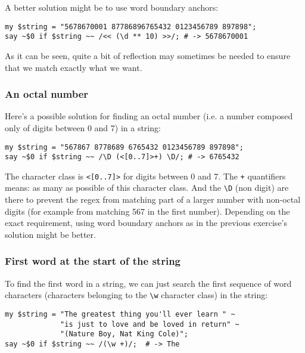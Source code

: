 A better solution might be to use word boundary anchors:

\begin{verbatim}
my $string = "5678670001 87786896765432 0123456789 897898";
say ~$0 if $string ~~ /<< (\d ** 10) >>/; # -> 5678670001
\end{verbatim}

As it can be seen, quite a bit of reflection may 
sometimes be needed to ensure that we match exactly 
what we want. 

\subsubsection{An octal number}

Here's a possible solution for finding an octal number (i.e. 
a number composed only of digits between 0 and 7) in 
a string:

\begin{verbatim}
my $string = "567867 8778689 6765432 0123456789 897898";
say ~$0 if $string ~~ /\D (<[0..7]>+) \D/; # -> 6765432
\end{verbatim}

The character class is \verb'<[0..7]>' for digits between 
0 and 7. The \verb'+' quantifiers means: as many as possible 
of this character class. And the \verb'\D' (non digit) are 
there to prevent the regex from matching part of a larger 
number with non-octal digits (for example from matching 567 
in the first number). Depending on the exact requirement, 
using word boundary anchors as in the previous exercise's 
solution might be better.

\subsubsection{First word at the start of the string}

To find the first word in a string, we can just search the 
first sequence of word characters (characters belonging to 
the \verb'\w' character class) in the string:

\begin{verbatim}
my $string = "The greatest thing you'll ever learn " ~
             "is just to love and be loved in return" ~
             "(Nature Boy, Nat King Cole)";
say ~$0 if $string ~~ /(\w +)/;  # -> The
\end{verbatim}


